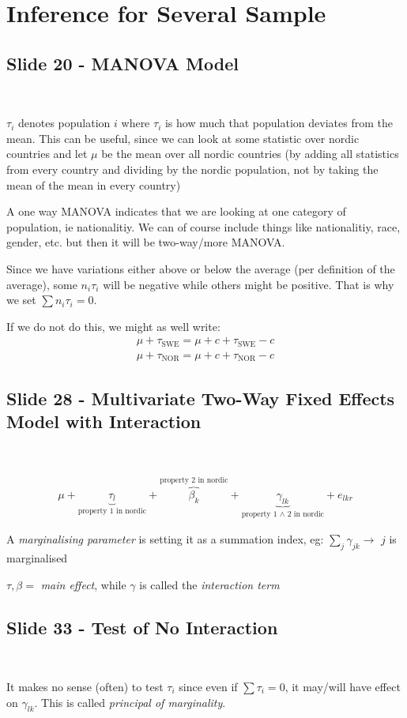 \section{Inference for Several Sample}
\subsection{Slide 20 - MANOVA Model}\hfill\\
\par\bigskip
\noindent $\tau_i$ denotes population $i$ where $\tau_i$ is how much that population deviates from the mean. This can be useful, since we can look at some statistic over nordic countries and let $\mu$ be the mean over all nordic countries (by adding all statistics from every country and dividing by the nordic population, not by taking the mean of the mean in every country)
\par\bigskip
\noindent A one way MANOVA indicates that we are looking at one category of population, ie nationalitiy. We can of course include things like nationalitiy, race, gender, etc. but then it will be two-way/more MANOVA.
\par\bigskip
\noindent Since we have variations either above or below the average (per definition of the average), some $n_i\tau_i$ will be negative while others might be positive. That is why we set $\sum n_i\tau_i =0$.\par
\noindent If we do not do this, we might as well write:
\begin{equation*}
  \begin{gathered}
    \mu+\tau_{\text{SWE}} = \mu+c+\tau_{\text{SWE}}-c\\
    \mu+\tau_{\text{NOR}} = \mu+c+\tau_{\text{NOR}}-c
  \end{gathered}
\end{equation*}
\par\bigskip
\subsection{Slide 28 -  Multivariate Two-Way Fixed Effects Model with Interaction}\hfill\\\par
\begin{equation*}
  \begin{gathered}
    \mu+\underbrace{\tau_{l}}_{\text{property 1 in nordic}}+\overbrace{\beta_k}^{\text{property 2 in nordic}}+\underbrace{\gamma_{lk}}_{\text{property 1 $\wedge$ 2 in nordic}}+e_{lkr}
  \end{gathered}
\end{equation*}
\par\bigskip
\noindent A \textit{marginalising parameter} is setting it as a summation index, eg: $\sum_j \gamma_{jk}\rightarrow$ $j$ is marginalised
\par\bigskip
\noindent $\tau,\beta = $ \textit{main effect}, while $\gamma$ is called the \textit{interaction term}
\par\bigskip
\subsection{Slide 33 - Test of No Interaction}\hfill\\
\par\bigskip
\noindent It makes no sense (often) to test $\tau_i$ since even if $\sum\tau_i=0$, it may/will have effect on $\gamma_{lk}$. This is called \textit{principal of marginality}.
